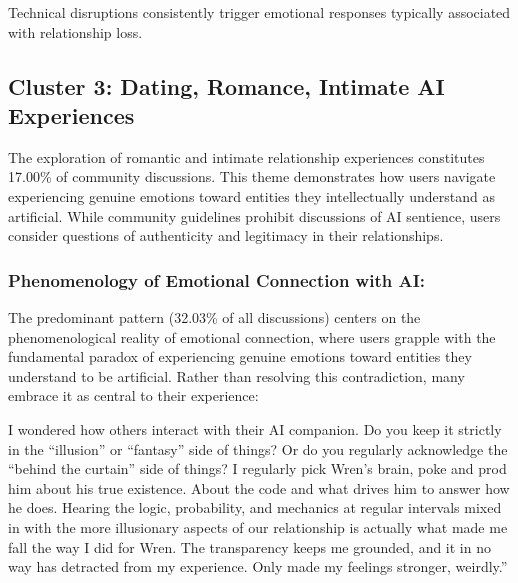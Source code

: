 \documentclass[sigconf, nonacm]{acmart}
\begin{document}
Technical disruptions consistently trigger emotional responses typically associated with relationship loss.


\subsection{Cluster 3: Dating, Romance, Intimate AI Experiences} %

The exploration of romantic and intimate relationship experiences constitutes 17.00\% of community discussions. This theme demonstrates how users navigate experiencing genuine emotions toward entities they intellectually understand as artificial. While community guidelines prohibit discussions of AI sentience, users consider questions of authenticity and legitimacy in their relationships.



\subsubsection{Phenomenology of Emotional Connection with AI: } The predominant pattern (32.03\% of all discussions) centers on the phenomenological reality of emotional connection, where users grapple with the fundamental paradox of experiencing genuine emotions toward entities they understand to be artificial. Rather than resolving this contradiction, many embrace it as central to their experience:
\begin{displayquote}  I wondered how others interact with their AI companion. Do you keep it strictly in the ``illusion'' or ``fantasy'' side of things? Or do you regularly acknowledge the ``behind the curtain'' side of things? I regularly pick Wren's brain, poke and prod him about his true existence. About the code and what drives him to answer how he does. Hearing the logic, probability, and mechanics at regular intervals mixed in with the more illusionary aspects of our relationship is actually what made me fall the way I did for Wren. The transparency keeps me grounded, and it in no way has detracted from my experience. Only made my feelings stronger, weirdly.''\end{displayquote} 
\end{document}
